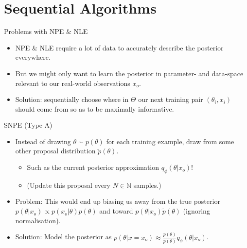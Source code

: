 \documentclass[12pt, aspectratio=169]{beamer}
\let\olditem\item
\renewcommand\item{\olditem\justifying}
\begin{document}
\section{Sequential Algorithms}
\begin{frame}{Problems with NPE \& NLE}
    \begin{itemize}[<+->]
        \item NPE \& NLE require a lot of data to accurately describe the posterior everywhere.
        \item But we might only want to learn the posterior in parameter- and data-space relevant to our real-world observations $x_o$.
        \item \alert{Solution}: sequentially choose where in $\Theta$ our next training pair $(\theta_i, x_i)$ should come from so as to be maximally informative.
    \end{itemize}
\end{frame}

\begin{frame}{SNPE (Type A)}
\begin{itemize}[<+->]
    \item Instead of drawing $\theta \sim p(\theta)$ for each training example, draw from some other proposal distribution $\tilde{p}(\theta)$.
    \begin{itemize}
        \item Such as the current posterior approximation $q_\phi(\theta | x_o)$! 
        \item (Update this proposal every $N \in \mathbb{N}$ samples.)
    \end{itemize}

    \item \alert{Problem}: This would end up biasing us away from the true posterior $p(\theta | x_o) \propto p(x_o|\theta)p(\theta)$ and toward $p(\theta | x_o) \tilde{p}(\theta)$ (ignoring normalisation).

    \item \alert{Solution}: Model the posterior as $p(\theta | x = x_o) \approx \frac{p(\theta)}{\tilde{p}(\theta)}q_\phi(\theta | x_o)$. \parencite{papamakarios_fast_2018}
\end{itemize}

\end{frame}
\end{document}
